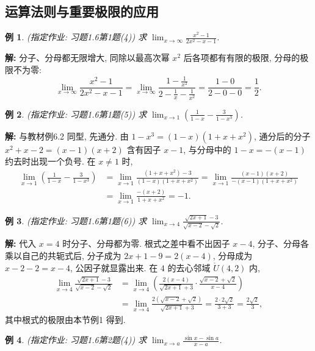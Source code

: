 \documentclass[UTF8,openany]{ctexbook}
\theoremstyle{chinesetextbook}
\newtheorem{example}{例}[section]
\newenvironment{cnsolution}{\par\indent\textbf{解:} \ignorespaces}{\par}
\begin{document}
\subsection{运算法则与重要极限的应用}
\begin{example}
\textnormal{(指定作业: 习题1.6第1题(4))} 求 $\displaystyle\lim_{x\to\infty}\frac{x^2-1}{2x^2-x-1}$.
\end{example}
\begin{cnsolution}
分子、分母都无限增大, 同除以最高次幂 $x^2$ 后各项都有有限的极限, 分母的极限不为零:
\[
\lim_{x\to\infty}\frac{x^2-1}{2x^2-x-1}=\lim_{x\to\infty}\frac{1-\frac1{x^2}}{2-\frac1x-\frac1{x^2}}=\frac{1-0}{2-0-0}=\frac12.
\]
\end{cnsolution}
\begin{example}
\textnormal{(指定作业: 习题1.6第1题(5))} 求 $\displaystyle\lim_{x\to1}\left(\frac1{1-x}-\frac3{1-x^3}\right)$.
\end{example}
\begin{cnsolution}
与教材例6.2 同型, 先通分. 由 $1-x^3=(1-x)(1+x+x^2)$, 通分后的分子 $x^2+x-2=(x-1)(x+2)$ 含有因子 $x-1$, 与分母中的 $1-x=-(x-1)$ 约去时出现一个负号. 在 $x\ne1$ 时,
\[
\begin{aligned}
\lim_{x\to1}\left(\frac1{1-x}-\frac3{1-x^3}\right)
&=\lim_{x\to1}\frac{(1+x+x^2)-3}{(1-x)(1+x+x^2)}=\lim_{x\to1}\frac{(x-1)(x+2)}{-(x-1)(1+x+x^2)}\\
&=\lim_{x\to1}\frac{-(x+2)}{1+x+x^2}=-1.
\end{aligned}
\]
\end{cnsolution}
\begin{example}
\textnormal{(指定作业: 习题1.6第1题(6))} 求 $\displaystyle\lim_{x\to4}\frac{\sqrt{2x+1}-3}{\sqrt{x-2}-\sqrt2}$.
\end{example}
\begin{cnsolution}
代入 $x=4$ 时分子、分母都为零. 根式之差中看不出因子 $x-4$, 分子、分母各乘以自己的共轭式后, 分子成为 $2x+1-9=2(x-4)$, 分母成为 $x-2-2=x-4$, 公因子就显露出来. 在 $4$ 的去心邻域 $\mathring U(4,2)$ 内,
\[
\begin{aligned}
\lim_{x\to4}\frac{\sqrt{2x+1}-3}{\sqrt{x-2}-\sqrt2}
&=\lim_{x\to4}\left(\frac{2(x-4)}{\sqrt{2x+1}+3}\cdot\frac{\sqrt{x-2}+\sqrt2}{x-4}\right)\\
&=\lim_{x\to4}\frac{2\left(\sqrt{x-2}+\sqrt2\right)}{\sqrt{2x+1}+3}=\frac{2\cdot2\sqrt2}{3+3}=\frac{2\sqrt2}3,
\end{aligned}
\]
其中根式的极限由本节例1 得到.
\end{cnsolution}
\begin{example}
\textnormal{(指定作业: 习题1.6第2题(4))} 求 $\displaystyle\lim_{x\to a}\frac{\sin x-\sin a}{x-a}$.
\end{example}
\end{document}
